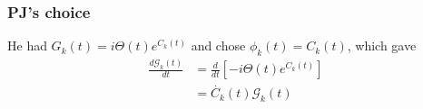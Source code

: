 \begin{frame}
    \frametitle{PJ's choice}
He had $G_k(t) = i \Theta(t) e^{C_k(t)}$ and chose $\phi_k(t)=C_k(t)$, which gave
\begin{align}
\frac{d \mathcal{G}_k(t)}{d t}&= \frac{d}{d t}\left[-i \Theta(t) e^{C_k(t)}\right] \\
&= \dot{C_k}(t) \mathcal{G}_k(t) 

\end{align}
\end{frame}
